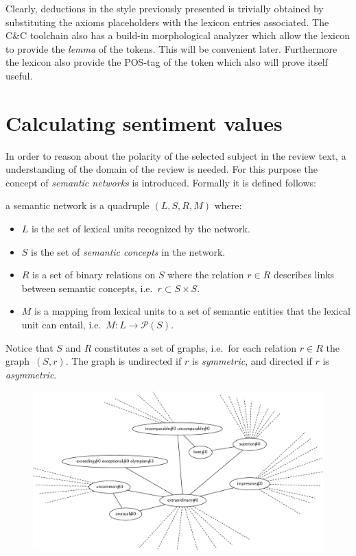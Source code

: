 Clearly, deductions in the style previously presented is trivially obtained by substituting the axioms placeholders with the lexicon entries associated. The C\&C toolchain also has a build-in morphological analyzer which allow the lexicon to provide the \emph{lemma} of the tokens. This will be convenient later. Furthermore the lexicon also provide the POS-tag of the token which also will prove itself useful.

\clearpage

\section{Calculating sentiment values}
In order to reason about the polarity of the selected subject in the review text, a understanding of the domain of the review is needed.  For this purpose the concept of \emph{semantic networks} is introduced. Formally it is defined follows:
\begin{definition}
a semantic network is a quadruple $(L,S,R,M)$ where:\\[-2em]
  \begin{itemize} %
    \item $L$ is the set of lexical units recognized by the network.
    \item $S$ is the set of \emph{semantic concepts} in the network.
    \item $R$ is a set of binary relations on $S$ where the relation $r \in R$ describes links\\ between semantic concepts, i.e.\ $r \subset S \times S$. 
    \item $M$ is a mapping from lexical units to a set of semantic entities that the lexical\\ unit can entail, i.e.\ $M: L \to \mathcal{P}(S)$.
  \end{itemize}
  \label{def:SemanticNetwork}
\end{definition}

Notice that $S$ and $R$ constitutes a set of graphs, i.e.\ for each relation $r \in R$ the graph~$(S,r)$. The graph is undirected if $r$ is \emph{symmetric}, and directed if $r$ is \emph{asymmetric}.

\begin{figure}[ht]
  \center
  \includegraphics[scale=.4]{Figures/Exceptional}
\end{figure}

